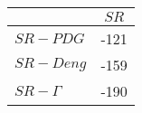 \begin{tabular}{l|c}
\toprule
{} &  $SR$ \\
\midrule
\textbf{$SR-PDG$   } &  -121 \\
\textbf{$SR-Deng$  } &  -159 \\
\textbf{$SR-\Gamma$} &  -190 \\
\bottomrule
\end{tabular}
